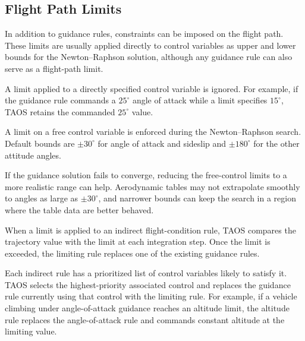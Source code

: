 \subsection{Flight Path Limits}\label{sec:flight-path-limits}

In addition to guidance rules, constraints can be imposed on the flight path. These
limits are usually applied directly to control variables as upper and lower bounds for
the Newton--Raphson solution, although any guidance rule can also serve as a
flight-path limit.


A limit applied to a directly specified control variable is ignored. For example, if
the guidance rule commands a $25^\circ$ angle of attack while a limit specifies
$15^\circ$, TAOS retains the commanded $25^\circ$ value.


A limit on a free control variable is enforced during the Newton--Raphson search.
Default bounds are $\pm30^\circ$ for angle of attack and sideslip and
$\pm180^\circ$ for the other attitude angles.

If the guidance solution fails to converge, reducing the free-control limits to a more
realistic range can help. Aerodynamic tables may not extrapolate smoothly to angles
as large as $\pm30^\circ$, and narrower bounds can keep the search in a region where
the table data are better behaved.


When a limit is applied to an indirect flight-condition rule, TAOS compares the
trajectory value with the limit at each integration step. Once the limit is exceeded,
the limiting rule replaces one of the existing guidance rules.

Each indirect rule has a prioritized list of control variables likely to satisfy it. TAOS
selects the highest-priority associated control and replaces the guidance rule
currently using that control with the limiting rule. For example, if a vehicle climbing
under angle-of-attack guidance reaches an altitude limit, the altitude rule replaces
the angle-of-attack rule and commands constant altitude at the limiting value.
